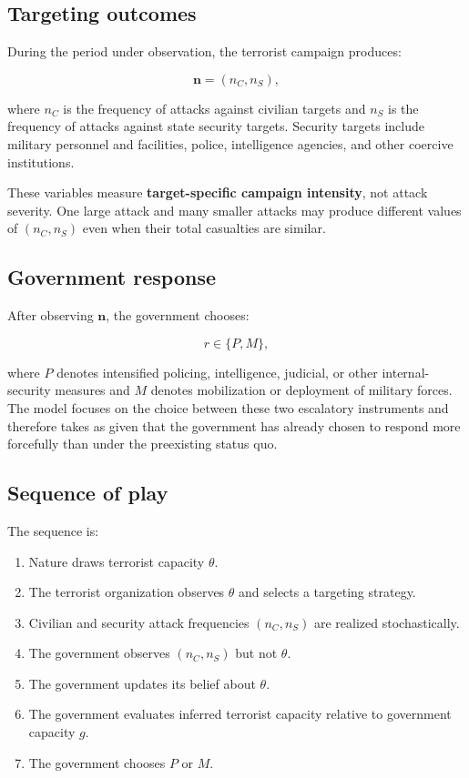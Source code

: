\documentclass[
  letterpaper,
  DIV=11,
  numbers=noendperiod]{scrartcl}
\providecommand{\tightlist}{%
  \setlength{\itemsep}{0pt}\setlength{\parskip}{0pt}}
\begin{document}
\subsection{Targeting outcomes}\label{targeting-outcomes}

During the period under observation, the terrorist campaign produces:

\[
\mathbf n=(n_C,n_S),
\]

where \(n_C\) is the frequency of attacks against civilian targets and
\(n_S\) is the frequency of attacks against state security targets.
Security targets include military personnel and facilities, police,
intelligence agencies, and other coercive institutions.

These variables measure \textbf{target-specific campaign intensity}, not
attack severity. One large attack and many smaller attacks may produce
different values of \((n_C,n_S)\) even when their total casualties are
similar.

\subsection{Government response}\label{government-response}

After observing \(\mathbf n\), the government chooses:

\[
r\in\{P,M\},
\]

where \(P\) denotes intensified policing, intelligence, judicial, or
other internal-security measures and \(M\) denotes mobilization or
deployment of military forces. The model focuses on the choice between
these two escalatory instruments and therefore takes as given that the
government has already chosen to respond more forcefully than under the
preexisting status quo.

\subsection{Sequence of play}\label{sequence-of-play}

The sequence is:

\begin{enumerate}
\def\labelenumi{\arabic{enumi}.}
\tightlist
\item
  Nature draws terrorist capacity \(\theta\).
\item
  The terrorist organization observes \(\theta\) and selects a targeting
  strategy.
\item
  Civilian and security attack frequencies \((n_C,n_S)\) are realized
  stochastically.
\item
  The government observes \((n_C,n_S)\) but not \(\theta\).
\item
  The government updates its belief about \(\theta\).
\item
  The government evaluates inferred terrorist capacity relative to
  government capacity \(g\).
\item
  The government chooses \(P\) or \(M\).
\end{enumerate}
\end{document}

